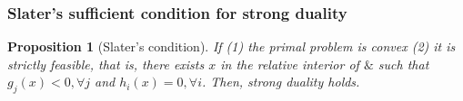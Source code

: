 \documentclass[11pt,a4paper]{article}
\newtheorem{proposition}{Proposition}
\begin{document}
\begin{center}
\end{center}

\subsubsection{Slater's sufficient condition for strong duality}
\begin{proposition}[Slater's condition]
    If (1) the primal problem is convex (2) it is strictly feasible, that is, there exists $x$ in the relative interior of $\&$ such that $g_j(x)<0,\forall j$ and $h_i(x)=0,\forall i$. Then, strong duality holds.
\end{proposition}
\end{document}
